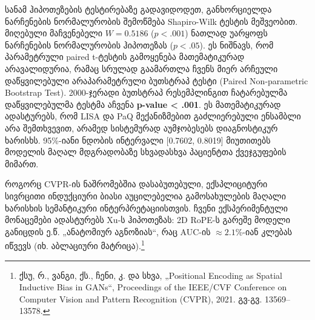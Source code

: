 \documentclass[12pt,a4paper,oneside]{report}
\begin{document}
სანამ ჰიპოთეზების ტესტირებაზე გადავიდოდეთ, განხორციელდა ნარჩენების ნორმალურობის შემოწმება Shapiro-Wilk ტესტის მეშვეობით. მიღებული მაჩვენებელი $W = 0.5186$ ($p < .001$) ნათლად უარყოფს ნარჩენების ნორმალურობის ჰიპოთეზას ($p < .05$). ეს ნიშნავს, რომ პარამეტრული paired t-ტესტის გამოყენება მათემატიკურად არავალიდურია, რამაც სრულად გაამართლა ჩვენს მიერ არჩეული დაწყვილებული არაპარამეტრული ბუთსტრაპ ტესტი (Paired Non-parametric Bootstrap Test). 2000-ჯერადი ბუთსტრაპ რესემპლინგით ჩატარებულმა დაწყვილებულმა ტესტმა აჩვენა \textbf{p-value < .001}. ეს მათემატიკურად ადასტურებს, რომ LISA და PaQ მექანიზმებით გაძლიერებული ენსამბლი არა შემთხვევით, არამედ სისტემურად აუმჯობესებს დიაგნოსტიკურ ხარისხს. 95\%-იანი ნდობის ინტერვალი [0.7602, 0.8019] მიუთითებს მოდელის მაღალ მდგრადობაზე სხვადასხვა პაციენტთა ქვეჯგუფების მიმართ.

როგორც CVPR-ის ნაშრომებშია დასაბუთებული, ექსპლიციტური სივრცითი ინდუქციური ბიასი აუცილებელია გამოსახულების მაღალი ხარისხის სემანტიკური ინტერპრეტაციისთვის. ჩვენი ექსპერიმენტული მონაცემები ადასტურებს Xu-ს ჰიპოთეზას: 2D RoPE-ს გარეშე მოდელი განიცდის ე.წ. „ანატომიურ აგნოზიას“, რაც AUC-ის $\approx 2.1\%$-იან კლებას იწვევს (იხ. აბლაციური მატრიცა).\footnote{ქსუ, რ., ვანგი, ქს., ჩენი, კ. და სხვა, „Positional Encoding as Spatial Inductive Bias in GANs“, Proceedings of the IEEE/CVF Conference on Computer Vision and Pattern Recognition (CVPR), 2021. გვ-გვ. 13569–13578.}
\end{document}

